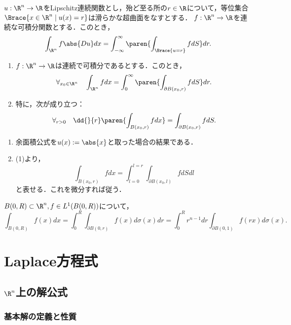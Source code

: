 \documentclass[uplatex,dvipdfmx]{jsreport}
\begin{document}
\begin{theorem}
    $u:\R^n\to\R$をLipschitz連続関数とし，殆ど至る所の$r\in\R$について，等位集合$\Brace{x\in\R^n\mid u(x)=r}$は滑らかな超曲面をなすとする．
    $f:\R^n\to\R$を連続な可積分関数とする．このとき，
    \[\int_{\R^n}f\abs{Du}dx=\int^\infty_{-\infty}\paren{\int_{\Brace{u=r}}fdS}dr.\]
\end{theorem}

\begin{corollary}[球面積分の性質]\mbox{}\label{cor-property-of-ball-surface-integral}
    \begin{enumerate}
        \item $f:\R^n\to\R$は連続で可積分であるとする．このとき，
        \[\forall_{x_0\in\R^n}\quad\int_{\R^n}fdx=\int^\infty_0\paren{\int_{\partial B(x_0,r)}fdS}dr.\]
        \item 特に，次が成り立つ：
        \[\forall_{r>0}\quad\dd{}{r}\paren{\int_{B(x_0,r)}fdx}=\int_{\partial B(x_0,r)}fdS.\]
    \end{enumerate}
\end{corollary}
\begin{Proof}\mbox{}
    \begin{enumerate}
        \item 余面積公式を$u(x):=\abs{x}$と取った場合の結果である．
        \item (1)より，
        \[\int_{B(x_0,r)}fdx=\int_{l=0}^{l=r}\int_{\partial B(x_0,l)}fdSdl\]
        と表せる．これを微分すれば従う．
    \end{enumerate}
\end{Proof}

\begin{corollary}[球面上の積分と球体上の積分との関係]\label{thm-sphere-and-ball}
    $B(0,R)\subset\R^n, f\in L^1(B(0,R))$について，
    \[\int_{B(0,R)}f(x)dx=\int^R_0\int_{\partial B(0,r)}f(x)d\sigma(x)dr=\int^R_0r^{n-1}dr\int_{\partial B(0,1)}f(rx)d\sigma(x).\]
\end{corollary}

\chapter{Laplace方程式}

\section{$\R^n$上の解公式}

\subsection{基本解の定義と性質}
\end{document}
